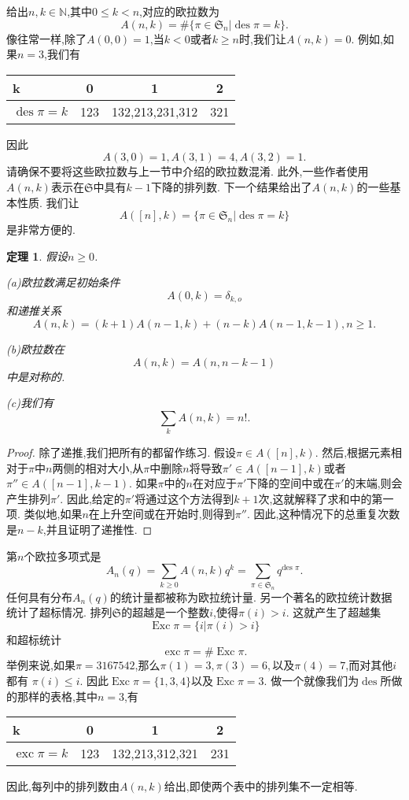 \documentclass[a4paper,12pt]{ctexbook}
\newtheorem{theorem}[lemma]{\hspace{2em}定理}%
\begin{document}
给出$n,k\in \mathbb{N}$,其中$0\le k<n$,对应的欧拉数为
$$A(n,k)=\#\{\pi\in \mathfrak{S}_n|\operatorname{des}\pi=k\}. $$
像往常一样,除了$A(0,0)=1$,当$k<0$或者$k\ge n$时,我们让$A(n,k)=0$. 
例如,如果$n=3$,我们有 
\begin{table}[htbp]
	\centering
	\begin{tabular}{l|| c| c| c}
		k&0&1&2\\  \hline
		$\operatorname{des}\pi =k$&123&132,213,231,312&321
	\end{tabular}
\end{table} 
因此
$$A(3,0)=1,A(3,1)=4,A(3,2)=1. $$
请确保不要将这些欧拉数与上一节中介绍的欧拉数混淆.  此外,一些作者使用$A(n,k)$表示在$\mathfrak{S}$中具有$k-1$下降的排列数.  下一个结果给出了$A(n,k)$的一些基本性质.  我们让$$A([n],k)=\{\pi\in \mathfrak{S}_n|\operatorname{des}\pi=k\}$$是非常方便的. 
\begin{theorem}
	假设$n\ge 0$. 
	
	(a)欧拉数满足初始条件
	$$A(0,k)=\delta_{k,o}$$
	和递推关系
	$$A(n,k)=(k+1)A(n-1,k)+(n-k)A(n-1,k-1),n\ge 1. $$
	
	(b)欧拉数在$$A(n,k)=A(n,n-k-1)$$中是对称的. 
	
	(c)我们有
	$$\sum_{k}A(n,k)=n!. $$
\end{theorem}
\begin{proof}
	除了递推,我们把所有的都留作练习.  假设$\pi\in A([n],k)$. 然后,根据元素相对于$\pi$中$n $两侧的相对大小,从$\pi$中删除$n$将导致$\pi'\in A([n-1],k)$或者$\pi''\in A([n-1],k-1)$. 如果$\pi$中的$n$在对应于$\pi'$下降的空间中或在$\pi'$的末端,则会产生排列$\pi'$.  因此,给定的$\pi'$将通过这个方法得到$k+1$次,这就解释了求和中的第一项.  类似地,如果$n$在上升空间或在开始时,则得到$\pi''$.  因此,这种情况下的总重复次数是$n-k$,并且证明了递推性.   
\end{proof}

第$n$个{\kaishu 欧拉多项式}是
$$A_n(q)=\sum_{k\ge0}A(n,k)q^k=\sum_{\pi \in \mathfrak{S}_{n}}q^{\text {des } \pi}. $$
任何具有分布${A}_n(q)$的统计量都被称为{\kaishu 欧拉统计量}.  另一个著名的欧拉统计数据统计了超标情况.  排列$\mathfrak{S}$的{\kaishu 超越}是一个整数$i$,使得$\pi (i)>i$.  这就产生了{\kaishu 超越集}$$\operatorname{Exc}\pi=\{i|\pi (i)>i\}$$和{\kaishu 超标统计}
$$ \operatorname{exc} \pi=\# \operatorname{Exc} \pi. $$
举例来说,如果$\pi=3167542$,那么$\pi(1)=3,\pi(3)=6,$以及$\pi(4)=7$,而对其他$i$都有
$\pi(i)\le i$. 因此$\operatorname{Exc} \pi=\{1,3,4\}$以及$\operatorname{Exc} \pi=3$. 
做一个就像我们为$\operatorname{des}$所做的那样的表格,其中$n=3$,有
\begin{table}[htbp]
  	\centering
  	\begin{tabular}{l|| c| c| c}
  		k&0&1&2\\  \hline
  		$\operatorname{exc}\pi =k$&123&132,213,312,321&231
  	\end{tabular}
\end{table} 
因此,每列中的排列数由$A(n,k)$给出,即使两个表中的排列集不一定相等.  
\end{document}
